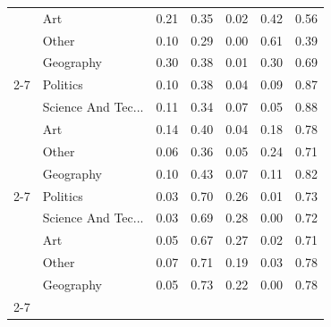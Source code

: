 \begin{table}[htbp]
\begin{tabular}{ll|cccc|c}
 & Art & 0.21 & 0.35 & 0.02 & 0.42 & 0.56 \\
 & Other & 0.10 & 0.29 & 0.00 & 0.61 & 0.39 \\
 & Geography & 0.30 & 0.38 & 0.01 & 0.30 & 0.69 \\
\cline{2-7}
\multirow{5}{*}{\rotatebox{90}{Llama 4 Maverick}} & Politics & 0.10 & 0.38 & 0.04 & 0.09 & 0.87 \\
 & Science And Tec... & 0.11 & 0.34 & 0.07 & 0.05 & 0.88 \\
 & Art & 0.14 & 0.40 & 0.04 & 0.18 & 0.78 \\
 & Other & 0.06 & 0.36 & 0.05 & 0.24 & 0.71 \\
 & Geography & 0.10 & 0.43 & 0.07 & 0.11 & 0.82 \\
\cline{2-7}
\multirow{5}{*}{\rotatebox{90}{Gemini 2.0 Flash}} & Politics & 0.03 & 0.70 & 0.26 & 0.01 & 0.73 \\
 & Science And Tec... & 0.03 & 0.69 & 0.28 & 0.00 & 0.72 \\
 & Art & 0.05 & 0.67 & 0.27 & 0.02 & 0.71 \\
 & Other & 0.07 & 0.71 & 0.19 & 0.03 & 0.78 \\
 & Geography & 0.05 & 0.73 & 0.22 & 0.00 & 0.78 \\
\cline{2-7}
\bottomrule
\end{tabular}
\end{table}


